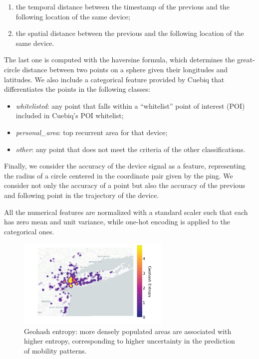 \documentclass{article}
\begin{document}
\begin{enumerate}
    \item the temporal distance between the timestamp of the previous and the following location of the same device;
    \item the spatial distance between the previous and the following location of the same device.
\end{enumerate}
The last one is computed with the haversine formula, which determines the great-circle distance between two points on a sphere given their longitudes and latitudes. We also include a categorical feature provided by Cuebiq that differentiates the points in the following classes:
\begin{itemize}
    \item \textit{whitelisted}: any point that falls within a ``whitelist'' point of interest (POI) included in Cuebiq's POI whitelist;
    \item \textit{personal\_area}: top recurrent area for that device;
    \item \textit{other}: any point that does not meet the criteria of the other classifications.
\end{itemize}
Finally, we consider the accuracy of the device signal as a feature, representing the radius of a circle centered in the coordinate pair given by the ping. We consider not only the accuracy of a point but also the accuracy of the previous and following point in the trajectory of the device.

All the numerical features are normalized with a standard scaler such that each has zero mean and unit variance, while one-hot encoding is applied to the categorical ones.

\begin{figure}[t!]
    \centering
        \includegraphics[width=0.65\textwidth]{./Images/Entropy_plot_only_spatial_data.png}
        	\centering
                \vspace{-5mm}
        	\caption{Geohash entropy: more densely populated areas are associated with higher entropy, corresponding to higher uncertainty in the prediction of mobility patterns.}
        	\label{fig: Entropy_plots}
\end{figure}
\end{document}

